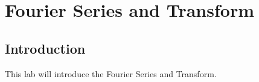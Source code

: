 \chapter{Fourier Series and Transform}

\section{Introduction}

This lab will introduce the Fourier Series and Transform.



